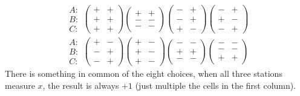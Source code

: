 \documentclass{article}
\begin{document}
$$
\begin{aligned}
\begin{array}{ccc}
A: \\
B: \\
C:
\end{array}
\left(\begin{array}{ccc}
+ & + \\
+ & + \\
+ & +
\end{array}\right)
\left(\begin{array}{ccc}
+ & + \\
- & - \\
- & -
\end{array}\right)
\left(\begin{array}{ccc}
- & + \\
- & + \\
+ & -
\end{array}\right)
\left(\begin{array}{ccc}
- & + \\
+ & - \\
- & +
\end{array}\right)
\\
\begin{array}{ccc}
A: \\
B: \\
C:
\end{array}
\left(\begin{array}{ccc}
+ & - \\
- & + \\
- & +
\end{array}\right)
\left(\begin{array}{ccc}
+ & - \\
+ & - \\
+ & -
\end{array}\right)
\left(\begin{array}{ccc}
- & - \\
+ & + \\
- & -
\end{array}\right)
\left(\begin{array}{ccc}
- & - \\
- & - \\
+ & +
\end{array}\right)
\end{aligned}
$$
There is something in common of the eight choices,
when all three stations measure $x$,
the result is always $+1$ (just multiple the cells in the first column).
\end{document}
